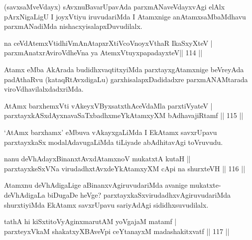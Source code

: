 \begin{artha}
(savxsaMveVdayx) sAvxnuBavarUpavAda parxmANaveVdayxvAgi elAlx pArxNigaLigU I joyxVtiyu iruvudariMda I Atamxnige anAtamxsaMbaMdhavu parxmANadiMda nishacxyisalapxDuvudilalx.
\end{artha}

\begin{shl}
na ceVdAtemxVtidhiVmAnAtapxrXtiVcoVnoyxV\s thaR IkaSxyXteV | \\
parxmAnatxrAviroVdheVna ya AtemxVtuyxpapadayxteV\hfill ||  114 ||  
\end{shl}

\begin{artha}
Atamx eMba AkArada budidhxvaqtitxyiMda parxtayxgAtamxnige beVreyAda padAthaRvu (kataqRtAvxdigaLu) garxhisalapxDadidadxre parxmANAMtarada viroVdhavilalxdadxriMda. 
\end{artha}

\begin{shl}
AtAmx barxhemxVti vAkeyxVByxsatxthAceVdaMla parxtiVyateV | \\
parxtayxkASxdAyxnavaSaTxbadhxmeYkAtamxyXM bAdhavajiRtamf \hfill||  115 ||  
\end{shl}

\begin{artha}
`AtAmx barxhamx' eMbuva vAkayxgaLiMda I EkAtamx savxrUpavu parxtayxkaSx modalAdavugaLiMda tiLiyade abAdhitavAgi toVruvudu.
\end{artha}


\begin{shl}
nanu deVhAdayxBinanxtAvxdAtamxnoV mukatxtA kutaH ||  \\
parxtayxkeSxVNa virudadhxtAvxdeYkAtamxyXM cApi na shurxteVH \hfill||  116 ||  
\end{shl}

\begin{artha}
Atamxnu deVhAdigaLige aBinanxvAgiruvudariMda avanige mukatxte- deVhAdigaLa biDugaDe heVge? parxtayxkaSxvirudadhxvAgiruvudariMda shurxtiyiMda EkAtamx savxrUpavu sariyAdAgi sididhxsuvudilalx.
\end{artha}


\begin{shl}
tathA hi kiSxtitoVyAginxmarutAM yoVgajaM matamf | \\
parxteyxVkaM shakatxyXBAveV\s pi ceYtanayxM madashakitxvatf \hfill||  117 ||  
\end{shl}

